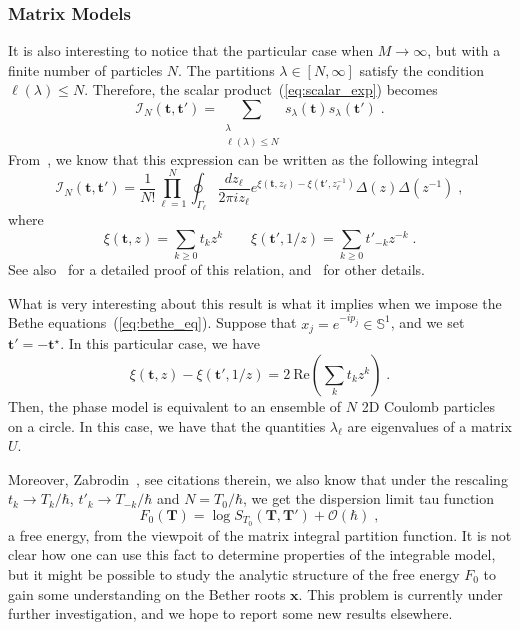 \documentclass[a4paper,11pt]{amsart}
\begin{document}
\subsubsection{Matrix Models}

It is also interesting to notice that the particular case when \(M\to
\infty\), but with a finite number of particles \(N\). The
partitions \(\lambda \in [N, \infty]\) satisfy the condition
\(\ell(\lambda) \leq N\). Therefore, the scalar
product~(\ref{eq:scalar_exp}) becomes
\begin{equation}
  \mathcal{I}_N(\bm{t}, \bm{t}') = \sum_{\substack{\lambda \\ \ell(\lambda) \leq N}}
  s_\lambda(\bm{t})  s_\lambda(\bm{t}') \; .
\end{equation}
From~\cite{Zabrodin:2010ii}, we know that this expression can be
written as the following integral
\begin{equation}
  \mathcal{I}_N(\bm{t}, \bm{t}') =
  \frac{1}{N!} \prod_{\ell=1}^N \oint_{\Gamma_\ell} \frac{dz_\ell}{2 \pi i z_\ell}
  e^{\xi(\bm{t}, z_\ell) - \xi(\bm{t}', z_{\ell}^{-1})} \Delta(z)\Delta(z^{-1})\; ,
\end{equation}
where
\begin{equation}
\xi(\bm{t}, z) = \sum_{k\geq 0} t_k z^k \qquad
\xi(\bm{t}', 1/z) = \sum_{k\geq 0} t'_{-k} z^{-k} \; . 
\end{equation}
See also~\cite{Kharchev:1991gd} for a detailed proof of this relation,
and~\cite{Orlov:2005} for other details. 

What is very interesting about this result is what it implies when we 
impose the Bethe equations~(\ref{eq:bethe_eq}). Suppose that 
\(x_j = e^{-ip_j} \in \mathbb{S}^1\), and we set \(\bm{t}' = - \bm{t}^\star\).
In this particular case, we have
\begin{equation}
\xi(\bm{t}, z) - \xi(\bm{t}', 1/z)  = 2 \ \textrm{Re}\left(\sum_k t_k z^k\right)\; .
\end{equation}
Then, the phase model is equivalent to an ensemble of \(N\) 2D Coulomb
particles on a circle. In this case, we have that the quantities
\(\lambda_{\ell}\) are eigenvalues of a matrix \(U\).

Moreover, Zabrodin~\cite{Zabrodin:2010ii}, see citations therein, we also know
that under the rescaling \(t_k \to T_k/ \hbar\), \(t'_k \to T_{-k}/ \hbar\)
and \(N = T_0/ \hbar\), we get the dispersion limit tau function 
\begin{equation}
  F_0(\bm{T}) = \log S_{T_0}(\bm{T}, \bm{T}') + \mathcal{O}(\hbar)\; ,
\end{equation}
a free energy, from the viewpoit of the matrix integral partition
function.  It is not clear how one can use this fact to determine
properties of the integrable model, but it might be possible to study
the analytic structure of the free energy \(F_0\) to gain some
understanding on the Bether roots \(\bm{x}\).  This problem is
currently under further investigation, and we hope to report some new
results elsewhere.
\end{document}
